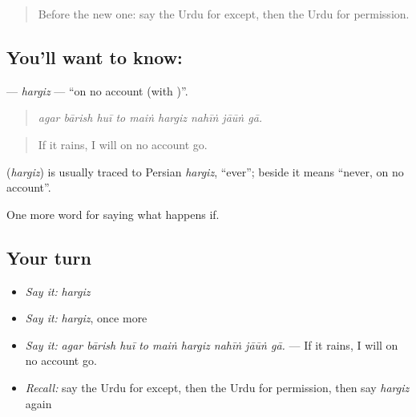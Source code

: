\label{lesson:UR-C366-hargiz}



\begin{quote}
Before the new one: say the Urdu for except, then the Urdu for permission.
\end{quote}

\subsection*{You'll want to know: }
\textbf{} — \emph{hargiz} — \textquotedblleft{}on no account (with )\textquotedblright{}.

\begin{quote}
        
\end{quote}

\begin{quote}
\emph{agar bārish huī to maiṅ hargiz nahīṅ jāūṅ gā.}
\end{quote}

\begin{quote}
If it rains, I will on no account go.
\end{quote}

\begin{cousinweb}
\textbf{} (\emph{hargiz}) is usually traced to Persian \emph{hargiz}, \textquotedblleft{}ever\textquotedblright{}; beside \textbf{} it means \textquotedblleft{}never, on no account\textquotedblright{}.
\end{cousinweb}

\begin{grammarlens}[title={What you've built}]
One more word for saying what happens if.
\end{grammarlens}

\subsection*{Your turn}
\begin{itemize}
\raggedright
  \item \emph{Say it:} \emph{hargiz}
  \item \emph{Say it:} \emph{hargiz}, once more
  \item \emph{Say it:} \emph{agar bārish huī to maiṅ hargiz nahīṅ jāūṅ gā.} — If it rains, I will on no account go.
  \item \emph{Recall:} say the Urdu for except, then the Urdu for permission, then say \emph{hargiz} again
\end{itemize}

